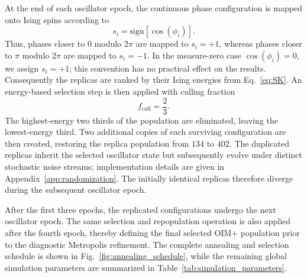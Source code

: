 \documentclass[
reprint,
amsmath,amssymb,
aps,
pre,
floatfix,
]{revtex4-2}
\begin{document}
At the end of each  oscillator epoch, the continuous phase configuration is mapped onto Ising spins according to
\begin{equation}
s_i=\mathrm{sign}[\cos(\phi_i)].
\label{eq:phase_binarization}
\end{equation}
Thus, phases closer to $0$ modulo $2\pi$ are mapped to $s_i=+1$, whereas phases closer to $\pi$ modulo $2\pi$ are mapped to $s_i=-1$. In the measure-zero case $\cos(\phi_i)=0$, we assign $s_i=+1$; this convention has no practical effect on the results. Consequently the replicas
are ranked by their Ising energies from Eq.~\eqref{eq:SK}. An energy-based
selection step is then applied with culling fraction
\begin{equation}
f_{\mathrm{cull}}=\frac{2}{3}.
\end{equation}
The highest-energy two thirds of the population are eliminated, leaving the
lowest-energy third. Two additional copies of each surviving configuration
are then created, restoring the replica population from $134$ to $402$.
The duplicated replicas inherit the selected oscillator state but subsequently
evolve under distinct stochastic noise streams; implementation details are
given in Appendix~\ref{app:randomization}. The initially identical replicas
therefore diverge during the subsequent oscillator epoch.

After the first three epochs, the replicated configurations undergo the next
oscillator epoch. The same selection and
repopulation operation is also applied after the fourth epoch, thereby
defining the final selected OIM+ population prior to the diagnostic
Metropolis refinement. The complete annealing and selection schedule is
shown in Fig.~\ref{fig:annealing_schedule}, while the remaining global
simulation parameters are summarized in
Table~\ref{tab:simulation_parameters}.
\end{document}

